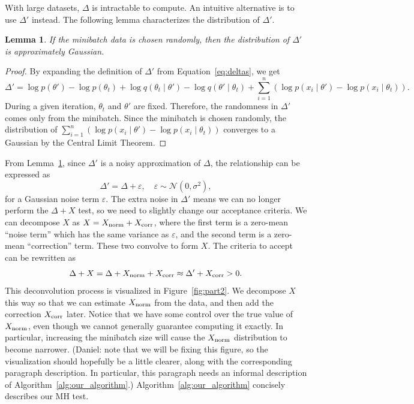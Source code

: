 \documentclass{article}
\newtheorem{lemma}{Lemma}
\begin{document}
With large datasets, $\Delta$ is intractable to compute. An intuitive alternative is to use
$\Delta'$ instead. The following lemma characterizes the distribution of $\Delta'$.

\begin{lemma}\label{lem:gaussian}
If the minibatch data is chosen randomly, then the distribution of $\Delta'$ is approximately Gaussian.
\end{lemma}

\begin{proof}
By expanding the definition of $\Delta'$ from Equation~\ref{eq:deltas}, we get
\[
\Delta' = \log p(\theta') - \log p(\theta_t) + \log q(\theta_t \mid \theta') - \log q(\theta' \mid \theta_t) +
\sum_{i=1}^n (\log p(x_i\mid \theta') - \log p(x_i\mid \theta_t)).
\]
During a given iteration, $\theta_t$ and $\theta'$ are fixed. Therefore, the randomness in $\Delta'$
comes only from the minibatch. Since the minibatch is chosen randomly, the distribution of
$\sum_{i=1}^n (\log p(x_i\mid \theta') - \log p(x_i\mid \theta_t))$ converges to a Gaussian by the
Central Limit Theorem.
\end{proof}

From Lemma~\ref{lem:gaussian}, since $\Delta'$ is a noisy approximation of $\Delta$, the
relationship can be expressed as
\begin{equation}\label{eq:relationship}
\Delta' = \Delta + \varepsilon, \quad \varepsilon \sim \mathcal{N}(0, \sigma^2),
\end{equation}
for a Gaussian noise term $\varepsilon$.  The extra noise in $\Delta'$ means we can no longer perform
the $\Delta + X$ test, so we need to slightly change our acceptance criteria. We can decompose
$X$ as $X = X_{\rm norm}+X_{\rm corr}$, where the first term is a zero-mean ``noise term'' which
has the same variance as $\varepsilon$, and the second term is a zero-mean ``correction'' term.
These two convolve to form $X$. The criteria to accept can be rewritten as
\begin{equation}\label{eq:criteria}
\Delta + X = \Delta + X_{\rm norm} + X_{\rm corr} \approx \Delta' + X_{\rm corr} >0.
\end{equation}
This deconvolution process is visualized in Figure~\ref{fig:part2}. We decompose $X$ this way so
that we can estimate $X_{\rm norm}$ from the data, and then add the correction $X_{\rm corr}$ later.
Notice that we have some control over the true value of $X_{\rm norm}$, even though we cannot
generally guarantee computing it exactly. In particular, increasing the minibatch size will cause
the $X_{\rm norm}$ distribution to become narrower. {\color{blue} (Daniel: note that we will be
fixing this figure, so the visualization should hopefully be a little clearer, along with the
corresponding paragraph description. In particular, this paragraph needs an informal description of
Algorithm~\ref{alg:our_algorithm}.)} Algorithm~\ref{alg:our_algorithm} concisely describes our MH
test.
\end{document}
